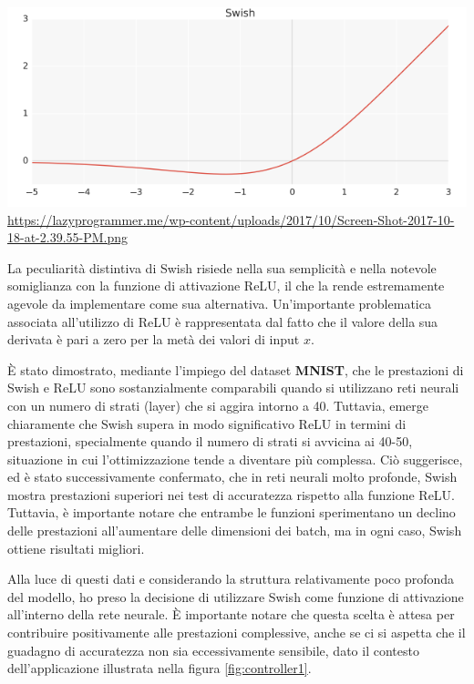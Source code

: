 \begin{minipage}{\linewidth}
	\centering
	\includegraphics[width=\textwidth]{img/Screen-Shot-2017-10-18-at-2.39.55-PM.png}
	\url{https://lazyprogrammer.me/wp-content/uploads/2017/10/Screen-Shot-2017-10-18-at-2.39.55-PM.png}
	\label{fig:swish}
\end{minipage}

La peculiarità distintiva di Swish risiede nella sua semplicità e 
nella notevole somiglianza con la funzione di attivazione ReLU, 
il che la rende estremamente agevole da implementare come sua alternativa. 
Un'importante problematica associata all'utilizzo di ReLU è 
rappresentata dal fatto che il valore della sua derivata è pari 
a zero per la metà dei valori di input $x$.

È stato dimostrato, mediante l'impiego del dataset \textbf{MNIST}, 
che le prestazioni di Swish e ReLU sono sostanzialmente comparabili 
quando si utilizzano reti neurali con un numero di strati (layer) 
che si aggira intorno a 40. Tuttavia, emerge chiaramente che Swish 
supera in modo significativo ReLU in termini di prestazioni, 
specialmente quando il numero di strati si avvicina ai 40-50, 
situazione in cui l'ottimizzazione tende a diventare più complessa. 
Ciò suggerisce, ed è stato successivamente confermato, che in reti 
neurali molto profonde, Swish mostra prestazioni superiori nei test 
di accuratezza rispetto alla funzione ReLU. Tuttavia, è importante 
notare che entrambe le funzioni sperimentano un declino delle 
prestazioni all'aumentare delle dimensioni dei batch, ma in ogni caso, 
Swish ottiene risultati migliori.

Alla luce di questi dati e considerando la struttura relativamente 
poco profonda del modello, ho preso la decisione di utilizzare 
Swish come funzione di attivazione all'interno della rete neurale. 
È importante notare che questa scelta è attesa per contribuire 
positivamente alle prestazioni complessive, anche se ci si aspetta 
che il guadagno di accuratezza non sia eccessivamente sensibile, 
dato il contesto dell'applicazione illustrata nella figura 
\ref{fig:controller1}.